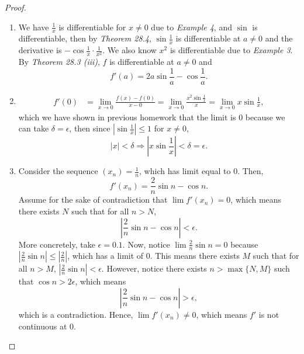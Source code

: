 \documentclass{article}
\renewcommand*{\implies}{\ensuremath{\Longrightarrow}}
\begin{document}
\begin{proof}
    \begin{enumerate}[label=\textbf{(\alph*)}]
        \item 
        We have $\frac{1}{x}$ is differentiable for $x\neq 0$ due to \emph{Example 4}, and $\sin$ is differentiable, 
        then by \emph{Theorem 28.4}, $\sin\frac{1}{x}$ is differentiable at $a\neq 0$ and the derivative 
        is $-\cos \frac{1}{x}\cdot \frac{1}{x^2}$. We also know $x^2$ is differentiable due to 
        \emph{Example 3}. By \emph{Theorem 28.3 (iii)}, $f$ is differentiable at $a\neq 0$ and
        $$f'(a)=2a\sin \frac{1}{a}-\cos \frac{1}{a}.$$

        \item \begin{align*}
            f'(0) & = \lim_{x\to0} \frac{f(x)-f(0)}{x-0} = 
            \lim_{x\to0} \frac{x^2\sin \frac{1}{x}}{x} = 
            \lim_{x\to0} x\sin \frac{1}{x},
        \end{align*}
        which we have shown in previous homework that the limit is 0 because 
        we can take $\delta = \epsilon$, then since $|\sin\frac{1}{x}|\le 1$ for $x\neq 0$,
        $$|x|<\delta\implies \left|x\sin\frac{1}{x}\right|<\delta=\epsilon.$$

        \item Consider the sequence $(x_n)=\frac{1}{n}$, which has limit equal to 0. Then, 
        $$f'(x_n) = \frac{2}{n}\sin n - \cos n.$$ Assume for the sake of contradiction that
        $\lim f'(x_n)=0$, which means there exists $N$ such that for all $n> N$,
        $$\left|\frac{2}{n}\sin n - \cos n\right|<\epsilon.$$ More concretely, take $\epsilon = 0.1$.
        Now, notice $\lim \frac{2}{n}\sin n=0$
        because $\left|\frac{2}{n}\sin n\right|\le \left|\frac{2}{n}\right|$, which has a limit of 0. 
        This means there exists $M$ such that for all $n> M$, $\left|\frac{2}{n}\sin n\right|<\epsilon$.
        However, notice there exists $n> \max\{N,M\}$ such that $\cos n > 2\epsilon$, which means 
        $$\left|\frac{2}{n}\sin n - \cos n\right|>\epsilon,$$
        which is a contradiction. Hence, $\lim f'(x_n)\neq 0$, which means $f'$ is not continuous 
        at 0.

    \end{enumerate}
\end{proof}

\newpage
\end{document}
